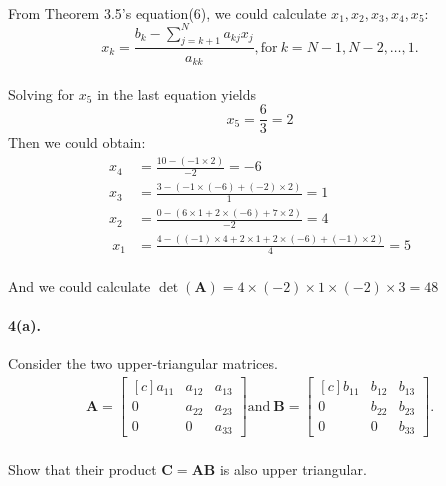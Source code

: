 \documentclass{article}  %
\begin{document}
        \paragraph{}From Theorem 3.5's equation(6), we could calculate $x_1, x_2, x_3, x_4, x_5$:
        $$x_k = \frac{b_k - \sum_{j = k + 1}^{N}a_{kj}x_j }{a_{kk}}, \mathrm{for} \ k = N - 1, N - 2, \dots , 1.$$
        \paragraph{}Solving for $x_5$ in the last equation yields
        $$x_5 = \frac{6}{3} = 2$$
        Then we could obtain:
        \begin{align*}
        x_4 &= \frac{10 - (-1 \times 2)}{-2} = -6 \\
        x_3 &= \frac{3 - (-1 \times (-6) + (-2) \times 2)}{1} = 1 \\
        x_2 &= \frac{0 - (6 \times 1 + 2 \times (-6) + 7 \times 2)}{-2} = 4 \\\
        x_1 &= \frac{4 - ((-1) \times 4 + 2 \times 1 + 2 \times (-6) + (-1) \times 2)}{4} = 5
        \end{align*}
        \paragraph{}And we could calculate $\det(\mathbf{A}) = 4 \times (-2) \times 1 \times (-2) \times 3 = 48$
        \paragraph{4(a).}Consider the two upper-triangular matrices.
        \begin{align*}
            \mathbf{A} = \begin{bmatrix*}[c]
                a_{11} & a_{12} & a_{13} \\
                0 & a_{22} & a_{23} \\
                0 & 0 & a_{33}
            \end{bmatrix*} 
            \mathrm{and} \ 
            \mathbf{B} =  \begin{bmatrix*}[c]
                b_{11} & b_{12} & b_{13} \\
                0 & b_{22} & b_{23} \\
                0 & 0 & b_{33}
            \end{bmatrix*}.
        \end{align*}
        \paragraph{}Show that their product $\mathbf{C} = \mathbf{A} \mathbf{B}$ is also upper triangular.
\end{document}
